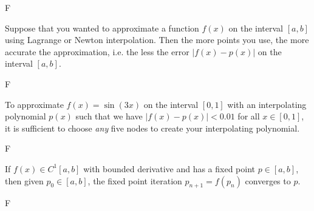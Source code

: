 \documentclass[11pt,letterpaper]{article}
\begin{document}
F


Suppose that you wanted to approximate a function $f(x)$ on the interval $[a, b]$ using Lagrange or Newton interpolation. Then the more points you use, the more accurate the approximation, i.e. the less the error $|f(x) - p(x)|$ on the interval $[a, b]$. 

F



To approximate $f(x)= \sin(3x)$ on the interval $[0, 1]$ with an interpolating polynomial $p(x)$ such that we have $|f(x) - p(x)| < 0.01$ for all $x \in [0, 1]$, it is sufficient to choose \textit{any} five nodes to create your interpolating polynomial. 

F


If $f(x) \in C^1[a, b]$ with bounded derivative and has a fixed point $p \in [a, b]$, then given $p_0 \in [a, b]$, the fixed point iteration $p_{n+1}= f(p_n)$ converges to $p$. 

F
\end{document}
